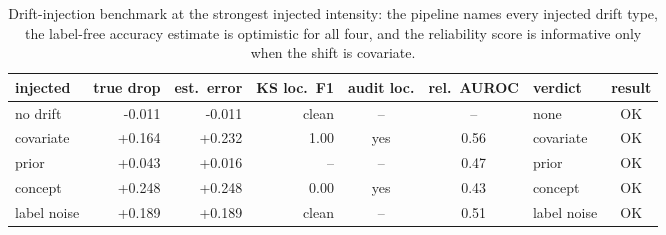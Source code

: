 \begin{table}[!htbp]
\centering
\caption{Drift-injection benchmark at the strongest injected intensity: the pipeline names every injected drift type, the label-free accuracy estimate is optimistic for all four, and the reliability score is informative only when the shift is covariate.}
\label{tab:injection-benchmark}
\renewcommand{\arraystretch}{1.2}\setlength{\tabcolsep}{3pt}\scriptsize
\begin{tabular}{@{}l r r r c c l c@{}}
\toprule
injected & true drop & est.\ error & KS loc.\ F1 & audit loc. & rel.\ AUROC & verdict & result \\
\midrule
no drift & -0.011 & -0.011 & clean & -- & -- & none & OK \\
covariate & +0.164 & +0.232 & 1.00 & yes & 0.56 & covariate & OK \\
prior & +0.043 & +0.016 & -- & -- & 0.47 & prior & OK \\
concept & +0.248 & +0.248 & 0.00 & yes & 0.43 & concept & OK \\
label noise & +0.189 & +0.189 & clean & -- & 0.51 & label noise & OK \\
\bottomrule
\end{tabular}
\end{table}
